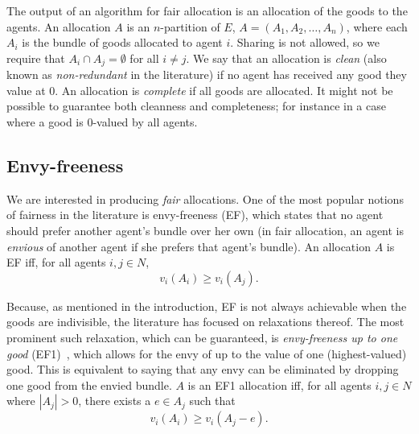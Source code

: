 The output of an algorithm for fair allocation is an allocation of the goods to the agents. An allocation $A$ is an $n$-partition of $E$, $A = (A_1, A_2, \dots, A_n)$, where each $A_i$ is the bundle of goods allocated to agent $i$. Sharing is not allowed, so we require that $A_i\cap A_j = \emptyset$ for all $i\neq j$. We say that an allocation is \textit{clean} (also known as \textit{non-redundant} in the literature) if no agent has received any good they value at 0. An allocation is \textit{complete} if all goods are allocated. It might not be possible to guarantee both cleanness and completeness; for instance in a case where a good is 0-valued by all agents.

\subsection{Envy-freeness}
We are interested in producing \textit{fair} allocations. One of the most popular notions of fairness in the literature is envy-freeness (EF), which states that no agent should prefer another agent's bundle over her own (in fair allocation, an agent is \textit{envious} of another agent if she prefers that agent's bundle). An allocation $A$ is EF iff, for all agents $i,j\in N$,
\begin{equation} \tag{EF}
  v_i(A_i) \geq v_i(A_j).
\end{equation}

Because, as mentioned in the introduction, EF is not always achievable when the goods are indivisible, the literature has focused on relaxations thereof. The most prominent such relaxation, which can be guaranteed, is \textit{envy-freeness up to one good} (EF1)~\cite{lipton-2004}, which allows for the envy of up to the value of one (highest-valued) good. This is equivalent to saying that any envy can be eliminated by dropping one good from the envied bundle. $A$ is an EF1 allocation iff, for all agents $i,j \in N$ where $|A_j| > 0$, there exists a $e \in A_j$ such that
\begin{equation} \tag{EF1}
  v_i(A_i) \geq v_i(A_j - e).
\end{equation}

